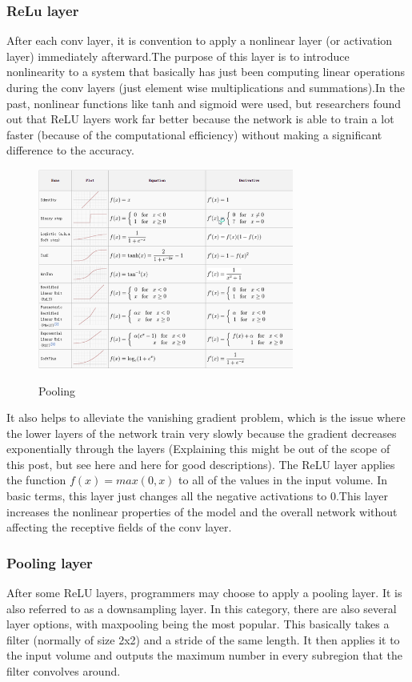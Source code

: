 \documentclass[12pt]{article}
\begin{document}
	\subsubsection{ReLu layer}

After each conv layer, it is convention to apply a nonlinear layer (or activation layer) immediately afterward.The purpose of this layer is to introduce nonlinearity to a system that basically has just been computing linear operations during the conv layers (just element wise multiplications and summations).In the past, nonlinear functions like tanh and sigmoid were used, but researchers found out that ReLU layers work far better because the network is able to train a lot faster (because of the computational efficiency) without making a significant difference to the accuracy.

 \begin{figure}[h]
    	\centering
    	\includegraphics[width=0.75\textwidth]{act.png}
       	\label{fig:mesh12}
	\caption{Pooling}
	\end{figure} 

 It also helps to alleviate the vanishing gradient problem, which is the issue where the lower layers of the network train very slowly because the gradient decreases exponentially through the layers (Explaining this might be out of the scope of this post, but see here and here for good descriptions). The ReLU layer applies the function $f(x) = max(0, x)$ to all of the values in the input volume. In basic terms, this layer just changes all the negative activations to 0.This layer increases the nonlinear properties of the model and the overall network without affecting the receptive fields of the conv layer.
        
        \subsubsection{Pooling layer}
         After some ReLU layers, programmers may choose to apply a pooling layer. It is also referred to as a downsampling layer. In this category, there are also several layer options, with maxpooling being the most popular. This basically takes a filter (normally of size 2x2) and a stride of the same length. It then applies it to the input volume and outputs the maximum number in every subregion that the filter convolves around.
         
\end{document}
